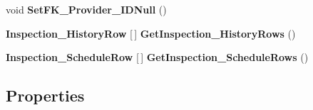 \begin{DoxyCompactItemize}
\item 
\mbox{\label{class_a_f_h___scheduler_1_1_home_inspection_db_data_set_1_1_home_row_a9562d1c44e295a3248c87da72134325c}} 
void {\bfseries Set\+F\+K\+\_\+\+Provider\+\_\+\+I\+D\+Null} ()
\item 
\mbox{\label{class_a_f_h___scheduler_1_1_home_inspection_db_data_set_1_1_home_row_a2df1f2155fcd973d78fcd5230e453ee9}} 
\textbf{ Inspection\+\_\+\+History\+Row} [$\,$] {\bfseries Get\+Inspection\+\_\+\+History\+Rows} ()
\item 
\mbox{\label{class_a_f_h___scheduler_1_1_home_inspection_db_data_set_1_1_home_row_ab821269ef8dc260be97ae98209e4e1cf}} 
\textbf{ Inspection\+\_\+\+Schedule\+Row} [$\,$] {\bfseries Get\+Inspection\+\_\+\+Schedule\+Rows} ()
\end{DoxyCompactItemize}
\subsection*{Properties}
